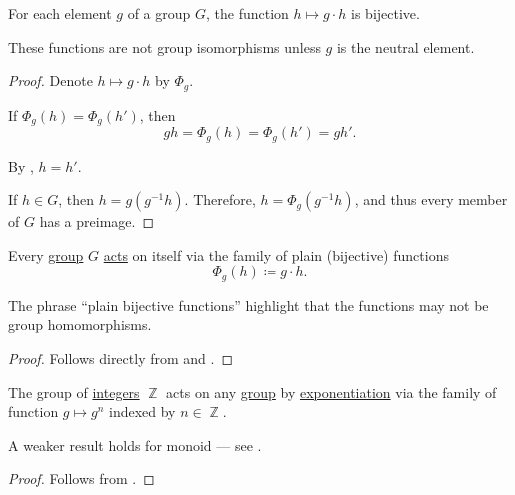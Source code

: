 \begin{lemma}\label{thm:group_operation_induces_bijections}
  For each element \( g \) of a group \( G \), the function \( h \mapsto g \cdot h \) is bijective.
\end{lemma}
\begin{comments}
  \item These functions are not group isomorphisms unless \( g \) is the neutral element.
\end{comments}
\begin{proof}
  Denote \( h \mapsto g \cdot h \) by \( \Phi_g \).

   If \( \Phi_g(h) = \Phi_g(h') \), then
  \begin{equation*}
    gh = \Phi_g(h) = \Phi_g(h') = gh'.
  \end{equation*}

  By , \( h = h' \).

   If \( h \in G \), then \( h = g(g^{-1} h) \). Therefore, \( h = \Phi_g(g^{-1} h) \), and thus every member of \( G \) has a preimage.
\end{proof}

\begin{proposition}\label{thm:group_is_action}
  Every \hyperref[def:group]{group} \( G \) \hyperref[def:group_action]{acts} on itself via the family of plain (bijective) functions
  \begin{equation*}
    \Phi_g(h) \coloneqq g \cdot h.
  \end{equation*}
\end{proposition}
\begin{comments}
  \item The phrase \enquote{plain bijective functions} highlight that the functions may not be group homomorphisms.
\end{comments}
\begin{proof}
  Follows directly from  and .
\end{proof}

\begin{proposition}\label{thm:exponentiation_group_action}
  The group of \hyperref[def:integers]{integers} \( \BbbZ \) acts on any \hyperref[def:group]{group} by \hyperref[def:monoid/exponentiation]{exponentiation} via the family of function \( g \mapsto g^n \) indexed by \( n \in \BbbZ \).
\end{proposition}
\begin{comments}
  \item A weaker result holds for monoid --- see .
\end{comments}
\begin{proof}
  Follows from .
\end{proof}

